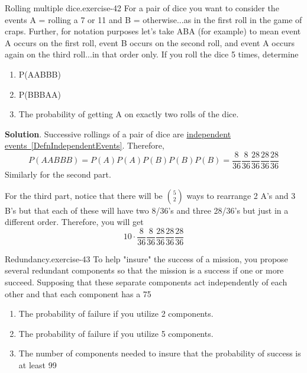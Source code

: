 \documentclass[10pt,]{book}
\numberwithin{equation}{section}
\begin{document}
%
\par
\hypertarget{p-633}{}%
\begin{inlineexercise}{Rolling multiple dice.}{exercise-42}%
\hypertarget{p-634}{}%
For a pair of dice you want to consider the events A = {rolling a 7 or 11} and B = {otherwise}...as in the first roll in the game of craps.  Further, for notation purposes let's take ABA (for example) to mean event A occurs on the first roll, event B occurs on the second roll, and event A occurs again on the third roll...in that order only. If you roll the dice 5 times, determine \leavevmode%
\begin{enumerate}
\item\hypertarget{li-185}{}P(AABBB)%
\item\hypertarget{li-186}{}P(BBBAA)%
\item\hypertarget{li-187}{}The probability of getting A on exactly two rolls of the dice.%
\end{enumerate}
%
\par\smallskip%
\noindent\textbf{Solution}.\hypertarget{solution-20}{}\quad%
\hypertarget{p-635}{}%
Successive rollings of a pair of dice are \hyperref[DefnIndependentEvents]{independent events~\ref{DefnIndependentEvents}}. Therefore,%
\begin{equation*}
P(AABBB) = P(A)P(A)P(B)P(B)P(B) = \frac{8}{36} \frac{8}{36} \frac{28}{36} \frac{28}{36} \frac{28}{36}
\end{equation*}
Similarly for the second part.%
\par
\hypertarget{p-636}{}%
For the third part, notice that there will be \(\binom{5}{2}\) ways to rearrange 2 A's and 3 B's but that each of these will have two 8/36's and three 28/36's but just in a different order. Therefore, you will get%
\begin{equation*}
10 \cdot \frac{8}{36} \frac{8}{36} \frac{28}{36} \frac{28}{36} \frac{28}{36}
\end{equation*}
%
\end{inlineexercise}
%
\par
\hypertarget{p-637}{}%
\begin{inlineexercise}{Redundancy.}{exercise-43}%
\hypertarget{p-638}{}%
To help "insure" the success of a mission, you propose several redundant components so that the mission is a success if one or more succeed. Supposing that these separate components act independently of each other and that each component has a 75%
\begin{enumerate}
\item\hypertarget{li-188}{}The probability of failure if you utilize 2 components.%
\item\hypertarget{li-189}{}The probability of failure if you utilize 5 components.%
\item\hypertarget{li-190}{}The number of components needed to insure that the probability of success is at least 99%
\end{enumerate}
%
\end{inlineexercise}
\end{document}
